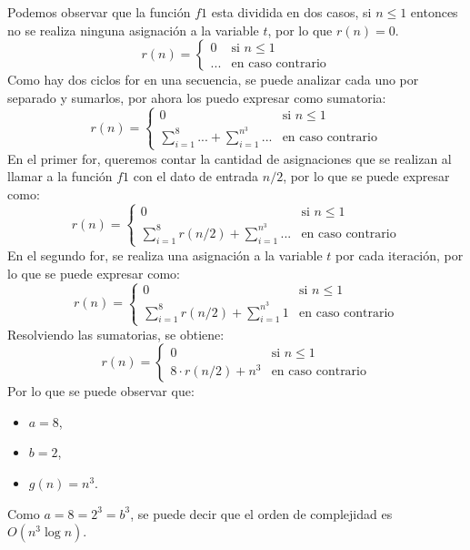 Podemos observar que la función $f1$ esta dividida en dos casos, si $n \leq 1$ entonces no se realiza ninguna asignación a la variable $t$, por lo que $r(n) = 0$.
\begin{equation*}
    r(n) = 
    \begin{cases}
        0 & \text{si } n \leq 1 \\
        ... & \text{en caso contrario}
    \end{cases}
\end{equation*}
Como hay dos ciclos for en una secuencia, se puede analizar cada uno por separado y sumarlos, por ahora los puedo expresar como sumatoria:
\begin{equation*}
    r(n) = 
    \begin{cases}
        0 & \text{si } n \leq 1 \\
        \sum_{i=1}^{8} ... + \sum_{i=1}^{n^3} ... & \text{en caso contrario}
    \end{cases}
\end{equation*}
En el primer for, queremos contar la cantidad de asignaciones que se realizan al llamar a la función $f1$ con el dato de entrada $n/2$, por lo que se puede expresar como:
\begin{equation*}
    r(n) = 
    \begin{cases}
        0 & \text{si } n \leq 1 \\
        \sum_{i=1}^{8} r(n/2) + \sum_{i=1}^{n^3} ... & \text{en caso contrario}
    \end{cases}
\end{equation*}
En el segundo for, se realiza una asignación a la variable $t$ por cada iteración, por lo que se puede expresar como:
\begin{equation*}
    r(n) = 
    \begin{cases}
        0 & \text{si } n \leq 1 \\
        \sum_{i=1}^{8} r(n/2) + \sum_{i=1}^{n^3} 1 & \text{en caso contrario}
    \end{cases}
\end{equation*}
Resolviendo las sumatorias, se obtiene:
\begin{equation*}
    r(n) = 
    \begin{cases}
        0 & \text{si } n \leq 1 \\
        8 \cdot r(n/2) + n^3 & \text{en caso contrario}
    \end{cases}
\end{equation*}
Por lo que se puede observar que:
\begin{itemize}
    \item $a = 8$,
    \item $b = 2$,
    \item $g(n) = n^3$.
\end{itemize}
Como $a = 8 = 2^3 = b^3$, se puede decir que el orden de complejidad es $O(n^3 \log n)$.